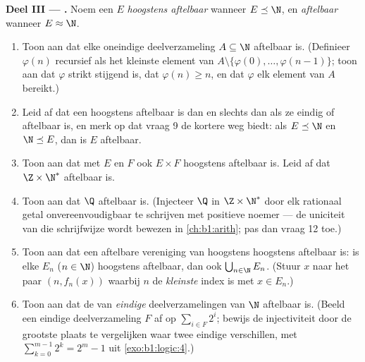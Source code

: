 \begin{problem}
\medskip
\noindent\textbf{Deel III --- .} Noem een
 $E$ \emph{hoogstens aftelbaar} wanneer $E \preceq \N$, en
\emph{aftelbaar} wanneer $E \approx \N$.
\begin{enumerate}[resume]
  \item Toon aan dat elke oneindige deelverzameling $A \subseteq \N$
        aftelbaar is. (Definieer $\varphi(n)$ recursief als het kleinste
        element van $A \setminus \{\varphi(0), \dots, \varphi(n-1)\}$;
        toon aan dat $\varphi$ strikt stijgend is, dat $\varphi(n) \geq
        n$, en dat $\varphi$ elk element van $A$ bereikt.)
  \item Leid af dat een  hoogstens aftelbaar is dan en slechts
        dan als ze eindig of aftelbaar is, en merk op dat vraag 9 de
        kortere weg biedt: als $E \preceq \N$ en $\N \preceq E$, dan is
        $E$ aftelbaar.
  \item Toon aan dat met $E$ en $F$ ook $E \times F$ hoogstens aftelbaar
        is. Leid af dat $\Z \times \N^*$ aftelbaar is.
  \item Toon aan dat $\Q$ aftelbaar is. (Injecteer $\Q$ in $\Z \times
        \N^*$ door elk rationaal getal onvereenvoudigbaar te schrijven
        met positieve noemer --- de uniciteit van die schrijfwijze wordt
        bewezen in \cref{ch:b1:arith}; pas dan vraag 12 toe.)
  \item Toon aan dat een aftelbare vereniging van hoogstens  hoogstens aftelbaar is: is elke $E_n$ ($n \in \N$)
        hoogstens aftelbaar, dan ook $\bigcup_{n \in \N} E_n$. (Stuur $x$
        naar het paar $(n, f_n(x))$ waarbij $n$ de \emph{kleinste} index
        is met $x \in E_n$.)
  \item Toon aan dat de  van \emph{eindige}
        deelverzamelingen van $\N$ aftelbaar is. (Beeld een eindige
        deelverzameling $F$ af op $\sum_{i \in F} 2^i$; bewijs de
        injectiviteit door de grootste plaats te vergelijken waar twee
        eindige  verschillen, met $\sum_{k=0}^{m-1} 2^k =
        2^m - 1$ uit \cref{exo:b1:logic:4}.)
\end{enumerate}


\end{problem}
